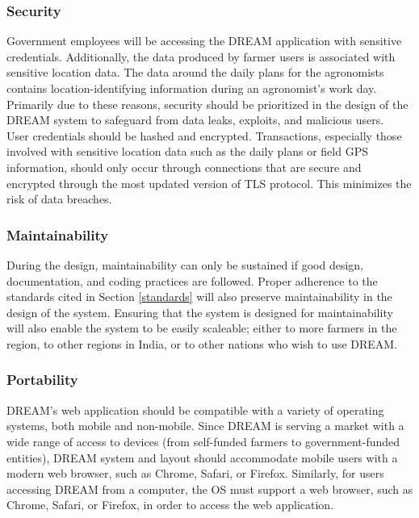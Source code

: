 \subsubsection{Security}
\begin{flushleft}
Government employees will be accessing the DREAM application with sensitive credentials. Additionally, the data produced by farmer users is associated with sensitive location data. The data around the daily plans for the agronomists contains location-identifying information during an agronomist's work day. Primarily due to these reasons, security should be prioritized in the design of the DREAM system to safeguard from data leaks, exploits, and malicious users.\smallskip\\
User credentials should be hashed and encrypted. Transactions, especially those involved with sensitive location data such as the daily plans or field GPS information, should only occur through connections that are secure and encrypted through the most updated version of TLS protocol. This minimizes the risk of data breaches.
\end{flushleft}

\subsubsection{Maintainability}
\begin{flushleft}
During the design, maintainability can only be sustained if good design, documentation, and coding practices are followed. Proper adherence to the standards cited in Section \ref{standards} will also preserve maintainability in the design of the system. Ensuring that the system is designed for maintainability will also enable the system to be easily scaleable; either to more farmers in the region, to other regions in India, or to other nations who wish to use DREAM.
\end{flushleft}

\subsubsection{Portability}
\begin{flushleft}
DREAM's web application should be compatible with a variety of operating systems, both mobile and non-mobile. Since DREAM is serving a market with a wide range of access to devices (from self-funded farmers to government-funded entities), DREAM system and layout should accommodate mobile users with a modern web browser, such as Chrome, Safari, or Firefox. Similarly, for users accessing DREAM from a computer, the OS must support a web browser, such as Chrome, Safari, or Firefox, in order to access the web application.
\end{flushleft}
